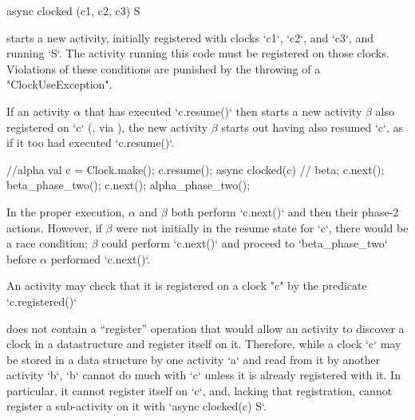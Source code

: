 \begin{xten}
  async clocked (c1, c2, c3) S
\end{xten}
starts a new activity, initially registered with
clocks \xcd`c1`, \xcd`c2`, and \xcd`c3`, and  running \xcd`S`. The activity running this code must
be registered on those clocks. 
Violations of these conditions are punished by the throwing of a
\xcd"ClockUseException". 


If an activity {$\alpha$} that has executed \xcd`c.resume()` then starts a
new activity {$\beta$} also registered on \xcd`c` (\eg, via ), the new activity {$\beta$} starts out having also resumed
\xcd`c`, as if it too had executed \xcd`c.resume()`.  
\begin{xten}
//alpha
val c = Clock.make();
c.resume();
async clocked(c) {
  // beta;
  c.next();
  beta_phase_two();
}
c.next();
alpha_phase_two();
\end{xten}
In the proper execution, {$\alpha$} and {$\beta$} both perform
\xcd`c.next()` and then their phase-2 actions.  
However, if {$\beta$} were not
initially in the resume state for \xcd`c`, there would be a race condition;
{$\beta$} could perform \xcd`c.next()` and proceed to \xcd`beta_phase_two`
before {$\alpha$} performed \xcd`c.next()`.


An activity may check that it is registered on a clock \xcd"c" by
the predicate \xcd`c.registered()`


\begin{note}
\Xten{} does not contain a ``register'' operation that would allow an activity
to discover a clock in a datastructure and register itself on it. Therefore,
while a clock \xcd`c` may be stored in a data structure by one activity
\xcd`a` and read from it by another activity \xcd`b`, \xcd`b` cannot do much
with \xcd`c` unless it is already registered with it.  In particular, it
cannot register itself on \xcd`c`, and, lacking that registration, cannot
register a sub-activity on it with \xcd`async clocked(c) S`.
\end{note}


